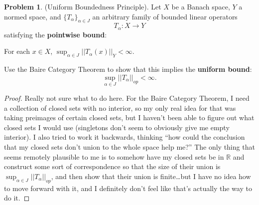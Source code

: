 \documentclass[12pt]{article}
\theoremstyle{definition}
\newtheorem{ex}{Problem}
\begin{document}
\begin{ex}
	(Uniform Boundedness Principle).
	Let $X$ be a Banach space, $Y$ a normed space, and $\lbrace T_\alpha \rbrace_{\alpha \in J}$ an arbitrary family of bounded linear operators \begin{equation*}
		T_\alpha : X \to Y
	\end{equation*}
	satisfying the \textbf{pointwise bound}: \begin{center}
		For each $x \in X$, \hspace{0.5em} $\sup_{\alpha \in J}||T_\alpha(x)||_Y < \infty$.
	\end{center}
	Use the Baire Category Theorem to show that this implies the \textbf{uniform bound}: \begin{equation*}
		\sup_{\alpha \in J} ||T_\alpha||_{op} < \infty.
	\end{equation*}
\end{ex}
\begin{proof}
  Really not sure what to do here.
  For the Baire Category Theorem, I need a collection of closed sets with no interior, so my only real idea for that was taking preimages of certain closed sets, but I haven't been able to figure out what closed sets I would use (singletons don't seem to obviously give me empty interior).
  I also tried to work it backwards, thinking ``how could the conclusion that my closed sets don't union to the whole space help me?''
  The only thing that seems remotely plausible to me is to somehow have my closed sets be in $\mathbb{R}$ and construct some sort of correspondence so that the size of their union is $\sup_{\alpha \in J} ||T_\alpha||_{op}$, and then show that their union is finite\dots but I have no idea how to move forward with it, and I definitely don't feel like that's actually the way to do it.
\end{proof}
\end{document}
